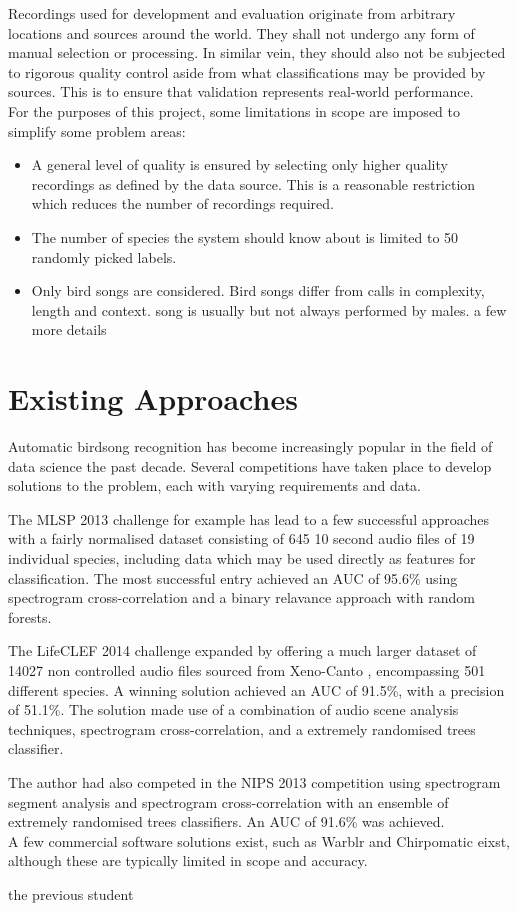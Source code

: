 Recordings used for development and evaluation
originate from arbitrary locations and sources around the world.
They shall not undergo any form of manual selection or processing.
In similar vein, they should also not be subjected to rigorous quality control
aside from what classifications may be provided by sources.
This is to ensure that validation represents real-world performance.\\

For the purposes of this project, some limitations in scope are imposed to
simplify some problem areas:
\begin{itemize}
\item A general level of quality is ensured by selecting only higher quality recordings
      as defined by the data source.
      This is a reasonable restriction which reduces the number of recordings required.
\item The number of species the system should know about is limited to 50
      randomly picked labels.
\item Only bird songs are considered.
      Bird songs differ from calls in complexity, length and context.
      song is usually but not always performed by males.
      a few more details
\end{itemize}


\section{Existing Approaches}
Automatic birdsong recognition has become increasingly popular in the field of
data science the past decade.
Several competitions have taken place to develop
solutions to the problem, each with varying requirements and data.

The MLSP 2013 challenge \parencite{kaggle} for example has lead to a few
successful approaches with a fairly normalised dataset consisting of 645 10
second audio files of 19 individual species, including data which may be used
directly as features for classification.
The most successful entry \parencite{fodor2013} achieved an AUC of 95.6\% using
spectrogram cross-correlation and a binary relavance approach with random forests.

The LifeCLEF 2014 challenge \parencite{lifeclef2014} expanded by offering a much
larger dataset of 14027 non controlled audio files sourced from Xeno-Canto
\parencite{xenocanto}, encompassing 501 different species.
A winning solution \parencite{lasseck2014} achieved an AUC of 91.5\%, with a
precision of 51.1\%.
The solution made use of a combination of audio scene analysis techniques,
spectrogram cross-correlation, and a extremely randomised trees classifier.

The author had also competed in the NIPS 2013 \parencite{nips} competition
using spectrogram segment analysis and spectrogram cross-correlation with an
ensemble of extremely randomised trees classifiers. An AUC of 91.6\% was
achieved.\\

A few commercial software solutions exist, such as Warblr \parencite{warblr} and
Chirpomatic \parencite{chirpomatic} eixst,
although these are typically limited in scope and accuracy.

the previous student
